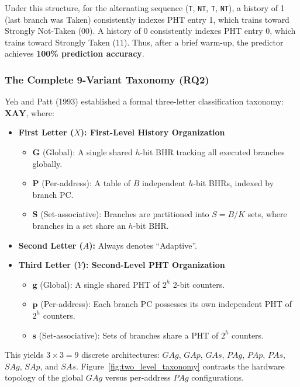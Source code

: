 \documentclass[11pt,a4paper]{article}
\begin{document}
Under this structure, for the alternating sequence (\texttt{T}, \texttt{NT}, \texttt{T}, \texttt{NT}), a history of 1 (last branch was Taken) consistently indexes PHT entry 1, which trains toward Strongly Not-Taken (00). A history of 0 consistently indexes PHT entry 0, which trains toward Strongly Taken (11). Thus, after a brief warm-up, the predictor achieves \textbf{100\% prediction accuracy}.

\subsubsection{The Complete 9-Variant Taxonomy (RQ2)}
Yeh and Patt (1993) established a formal three-letter classification taxonomy: $\mathbf{XAY}$, where:
\begin{itemize}[leftmargin=1.5em, itemsep=0.3em]
    \item \textbf{First Letter ($X$): First-Level History Organization}
    \begin{itemize}[leftmargin=1.5em]
        \item $\mathbf{G}$ (Global): A single shared $h$-bit BHR tracking all executed branches globally.
        \item $\mathbf{P}$ (Per-address): A table of $B$ independent $h$-bit BHRs, indexed by branch PC.
        \item $\mathbf{S}$ (Set-associative): Branches are partitioned into $S = B/K$ sets, where branches in a set share an $h$-bit BHR.
    \end{itemize}
    \item \textbf{Second Letter ($A$):} Always denotes ``Adaptive''.
    \item \textbf{Third Letter ($Y$): Second-Level PHT Organization}
    \begin{itemize}[leftmargin=1.5em]
        \item $\mathbf{g}$ (Global): A single shared PHT of $2^h$ 2-bit counters.
        \item $\mathbf{p}$ (Per-address): Each branch PC possesses its own independent PHT of $2^h$ counters.
        \item $\mathbf{s}$ (Set-associative): Sets of branches share a PHT of $2^h$ counters.
    \end{itemize}
\end{itemize}

This yields $3 \times 3 = 9$ discrete architectures: $GAg$, $GAp$, $GAs$, $PAg$, $PAp$, $PAs$, $SAg$, $SAp$, and $SAs$. Figure~\ref{fig:two_level_taxonomy} contrasts the hardware topology of the global $GAg$ versus per-address $PAg$ configurations.
\end{document}
